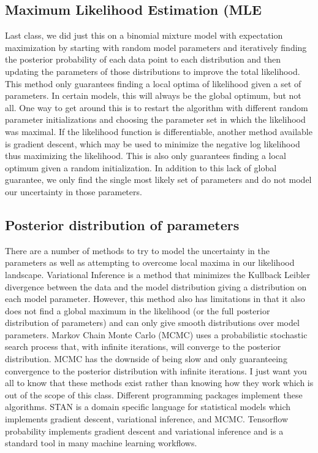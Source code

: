 \documentclass[11pt]{article}
\begin{document}
\subsection{Maximum Likelihood Estimation (MLE}
Last class, we did just this on a binomial mixture model with expectation maximization by starting with random model parameters and iteratively finding the posterior probability of each data point to each distribution and then updating the parameters of those distributions to improve the total likelihood. This method only guarantees finding a local optima of likelihood given a set of parameters. In certain models, this will always be the global optimum, but not all. One way to get around this is to restart the algorithm with different random parameter initializations and choosing the parameter set in which the likelihood was maximal. If the likelihood function is differentiable, another method available is gradient descent, which may be used to minimize the negative log likelihood thus maximizing the likelihood. This is also only guarantees finding a local optimum given a random initialization. In addition to this lack of global guarantee, we only find the single most likely set of parameters and do not model our uncertainty in those parameters.

\subsection{Posterior distribution of parameters}
There are a number of methods to try to model the uncertainty in the parameters as well as attempting to overcome local maxima in our likelihood landscape. Variational Inference is a method that minimizes the Kullback Leibler divergence between the data and the model distribution giving a distribution on each model parameter. However, this method also has limitations in that it also does not find a global maximum in the likelihood (or the full posterior distribution of parameters) and can only give smooth distributions over model parameters. Markov Chain Monte Carlo (MCMC) uses a probabilistic stochastic search process that, with infinite iterations, will converge to the posterior distribution. MCMC has the downside of being slow and only guaranteeing convergence to the posterior distribution with infinite iterations. I just want you all to know that these methods exist rather than knowing how they work which is out of the scope of this class. Different programming packages implement these algorithms. STAN is a domain specific language for statistical models which implements gradient descent, variational inference, and MCMC. Tensorflow probability implements gradient descent and variational inference and is a standard tool in many machine learning workflows.
\end{document}
